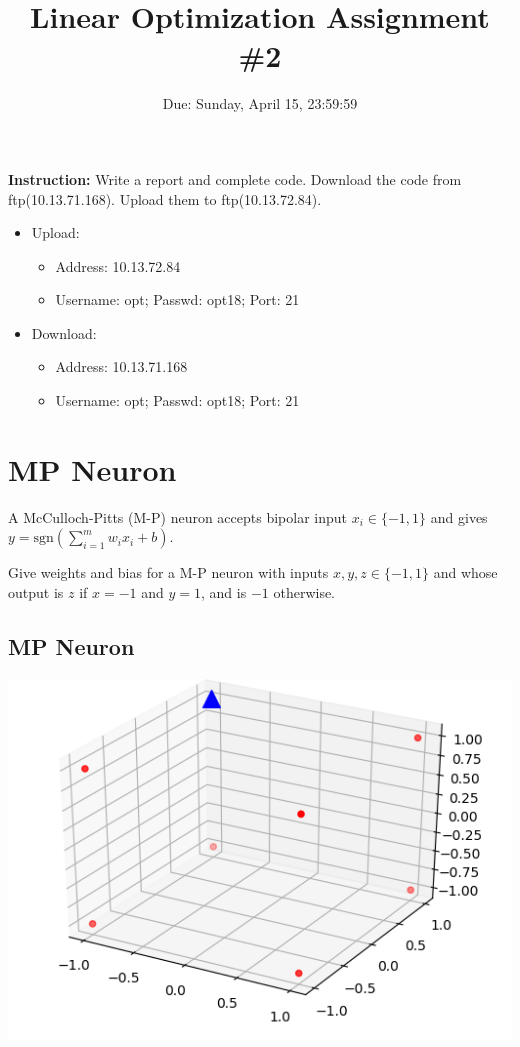 \documentclass[12pt]{article}
\title{\textbf{Linear Optimization Assignment \#2}}
\author{Due: Sunday, April 15, 23:59:59}
\date{}
\providecommand{\tightlist}{%
	\setlength{\itemsep}{0pt}\setlength{\parskip}{0pt}}
\begin{document}
\maketitle

\textbf{\color{NavyBlue}Instruction:} Write a report and complete code.
Download the code from ftp(10.13.71.168). Upload them to ftp(10.13.72.84).
\begin{itemize}
	\tightlist
	\item Upload:
	      \begin{itemize}
		      \tightlist
		      \item    Address: 10.13.72.84
		      \item Username: opt; Passwd:  opt18; Port: 21
	      \end{itemize}
	\item Download:
	      \begin{itemize}
		      \tightlist
		      \item Address: 10.13.71.168
		      \item  Username: opt; Passwd:  opt18; Port: 21
	      \end{itemize}
\end{itemize}



\section{MP Neuron}

A McCulloch-Pitts (M-P) neuron accepts bipolar input $x_i \in \{-1,1\}$ and gives  $y=\mathrm{sgn} (\sum_{i=1}^{m} w_ix_i + b) $.

Give weights and bias for a M-P neuron with inputs
$x,y,z \in \{-1,1\}$ and whose output is  $z$ if $x = -1$ and $y = 1$, and is $-1$ otherwise.

\subsection{MP Neuron}

\begin{center}
	\includegraphics[width=.5\textwidth]{fig/2018-04-02-14-19-18.png}
\end{center}
\end{document}
